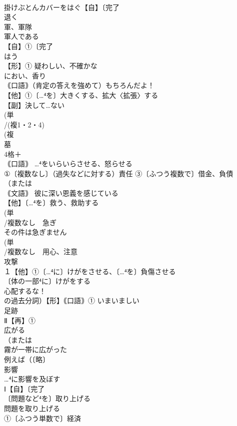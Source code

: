 \documentclass[8pt]{extreport}
\begin{document}
\begin{CJK}{UTF8}{min}
\\	掛けぶとんカバーをはぐ【自】〔完了
\\	退く 
\\	軍、軍隊 
\\	軍人である
\\	【自】①〔完了
\\	はう 
\\	【形】① 疑わしい、不確かな
\\	におい、香り
\\	｟口語｠（肯定の答えを強めて）もちろんだよ！
\\	【他】①〔…⁴を〕大きくする、拡大〈拡張〉する
\\	【副】決して…ない
\\	(単
\\	/(複1・2・4)
\\	(複
\\	墓
\\	4格＋
\\	｟口語｠ …⁴をいらいらさせる、怒らせる
\\	①〔複数なし〕（過失などに対する）責任 ③〔ふつう複数で〕借金、負債 
\\	（または
\\	｟文語｠ 彼に深い恩義を感じている
\\	【他】〔…⁴を〕救う、救助する 
\\	(単
\\	/複数なし　急ぎ 
\\	その件は急ぎません
\\	(単
\\	/複数なし　用心、注意 
\\	攻撃
\\	１【他】①〔…⁴に〕けがをさせる、〔…⁴を〕負傷させる 
\\	〔体の一部⁴に〕けがをする 
\\	心配するな！　
\\	の過去分詞）【形】｟口語｠① いまいましい 
\\	足跡 
\\	Ⅱ【再】①
\\	広がる 
\\	（または
\\	霧が一帯に広がった
\\	例えば（〔略〕
\\	影響
\\	…⁴に影響を及ぼす
\\	Ⅰ【自】〔完了
\\	〔問題など⁴を〕取り上げる 
\\	問題を取り上げる
\\	①〔ふつう単数で〕経済 

\end{CJK}
\end{document}

